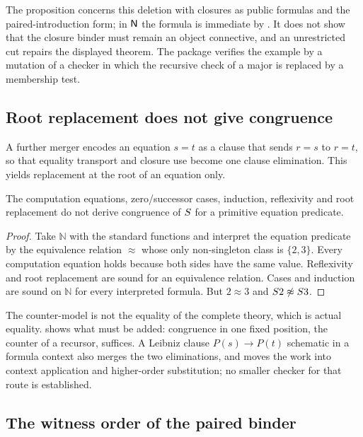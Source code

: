 The proposition concerns this deletion with closures as public formulas and the
paired-introduction form; in $\mathsf{N}$ the formula is immediate by .
It does not show that the closure binder must remain an object connective, and an
unrestricted cut repairs the displayed theorem. The package verifies the
example by a mutation of a checker in which the recursive check of a major is
replaced by a membership test.

\subsection{Root replacement does not give congruence}

A further merger encodes an equation $s=t$ as a clause that sends $r=s$ to
$r=t$, so that equality transport and closure use become one clause
elimination. This yields replacement at the root of an equation only.

\begin{proposition}
\label{obs:prop:root-vs-congruence}
The computation equations, zero/successor cases, induction, reflexivity and
root replacement do not derive congruence of $S$ for a primitive equation
predicate.
\end{proposition}

\begin{proof}
Take $\mathbb{N}$ with the standard functions and interpret the equation
predicate by the equivalence relation $\approx$ whose only non-singleton class
is $\{2,3\}$. Every computation equation holds because both sides have the same
value. Reflexivity and root replacement are sound for an equivalence relation.
Cases and induction are sound on $\mathbb{N}$ for every interpreted formula.
But $2\approx 3$ and $S 2\not\approx S 3$.
\end{proof}

The counter-model is not the equality of the complete theory, which is actual
equality.  shows what must be added: congruence in
one fixed position, the counter of a recursor, suffices. A Leibniz clause
$P(s)\to P(t)$ schematic in a formula context also merges the two
eliminations, and moves the work into context application and higher-order
substitution; no smaller checker for that route is established.

\subsection{The witness order of the paired binder}

